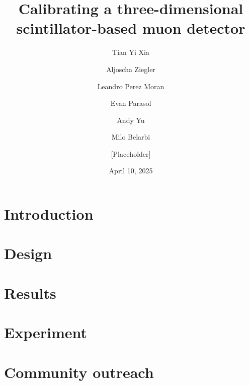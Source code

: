 \documentclass[12pt]{article}
\title{Calibrating a three-dimensional scintillator-based muon detector}
\author{Tian Yi Xia}
\author{Aljoscha Ziegler}
\author{Leandro Perez Moran}
\author{Evan Parasol}
\author{Andy Yu}
\author{Milo Belarbi}
\author{[Placeholder]}  %
\affil{Dawson College, Canada}
\date{April 10, 2025}
\begin{document}
\maketitle

\begin{multicols}{2}

\section{Introduction}


\section{Design}


\section{Results}


\section{Experiment}


\section{Community outreach}


\end{multicols}


\end{document}
